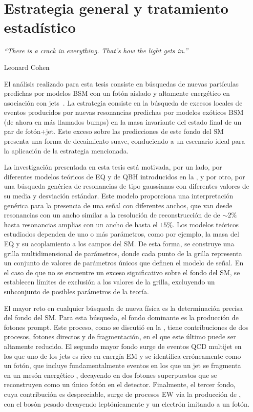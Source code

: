 \chapter{Estrategia general y tratamiento estadístico}
\label{ch:strategy}
\epigraph{\emph{``There is a crack in everything. That's how the light gets in.”}}{Leonard Cohen}





El análisis realizado para esta tesis consiste en búsquedas de nuevas partículas predichas por modelos \ac{BSM} con un fotón aislado y altamente energético en asociación con jets~\cite{ATLAS-PhotonJetResonances-Run2-NOTE}. La estrategia consiste en la búsqueda de excesos locales de eventos producidos por nuevas resonancias predichas por modelos exóticos \ac{BSM} (de ahora en más llamados bumps) en la masa invariante del estado final de un par de fotón+jet. Este exceso sobre las predicciones de este fondo del \ac{SM} presenta una forma de decaimiento suave, conduciendo a un escenario ideal para la aplicación de la estrategia mencionada.

La investigación presentada en esta tesis está motivada, por un lado, por diferentes modelos teóricos de \acf{EQ} y de \acf{QBH} introducidos en la \Sect{\ref{sec:theory:bsm}}, y por otro, por una búsqueda genérica de resonancias de tipo gaussianas con diferentes valores de su media y desviación estándar. Este modelo proporciona una interpretación genérica para la presencia de una señal con diferentes anchos, que van desde resonancias con un ancho similar a la resolución de reconstrucción de \myj de \(\sim 2\%\) hasta resonancias amplias con un ancho de hasta el \(15\%\).
Los modelos teóricos estudiados dependen de uno o más parámetros, como por ejemplo, la masa del \ac{EQ} y su acoplamiento a los campos del \ac{SM}. De esta forma, se construye una grilla multidimensional de parámetros, donde cada punto de la grilla representa un conjunto de valores de parámetros únicos que definen el modelo de señal. En el caso de que no se encuentre un exceso significativo sobre el fondo del \ac{SM}, se establecen límites de exclusión a los valores de la grilla, excluyendo un subconjunto de posibles parámetros de la teoría.


El mayor reto en cualquier búsqueda de nueva física es la determinación precisa del fondo del \ac{SM}. Para esta búsqueda, el fondo dominante es la producción de fotones prompt. Este proceso, como se discutió en la \Sect{\ref{subsec:theory:sm:prompt_photon}}, tiene contribuciones de dos procesos, fotones directos y de fragmentación, en el que este último puede ser altamente reducido. El segundo mayor fondo surge de eventos \ac{QCD} multijet en los que uno de los jets es rico en energía \ac{EM} y se identifica erróneamente como un fotón, que incluye fundamentalmente eventos en los que un jet se fragmenta en un mesón energético \pizero, decayendo en dos fotones superpuestos que se reconstruyen como un único fotón en el detector. Finalmente, el tercer fondo, cuya contribución es despreciable, surge de procesos \ac{EW} vía la producción de \WZjet, con el bosón pesado decayendo leptónicamente y un electrón imitando a un fotón.



